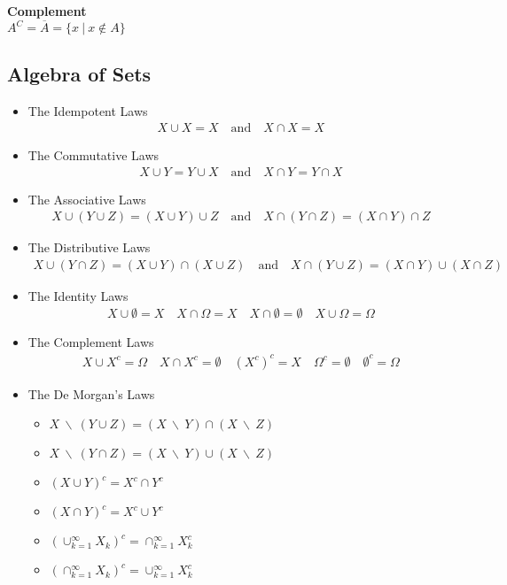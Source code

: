 \documentclass{article}
\numberwithin{theorem}{subsection}
\numberwithin{theorem}{subsubsection}
\numberwithin{lemma}{subsection}
\numberwithin{lemma}{subsubsection}
\theoremstyle{definition}
\numberwithin{definition}{subsection}
\numberwithin{definition}{subsubsection}
\begin{document}
\noindent \textbf{Complement} \\
\indent $A^{C} = \overline{A} = \{x\ |\ x \notin A\}$ \\

\subsection{Algebra of Sets}
\begin{itemize}
    \item The Idempotent Laws 
    \begin{gather*}
        X \cup X = X \quad \text{and} \quad X \cap X = X
    \end{gather*}
    \item The Commutative Laws
    \begin{gather*}
        X \cup Y = Y \cup X \quad \text{and} \quad X \cap Y = Y \cap X
    \end{gather*}
    \item The Associative Laws
    \begin{gather*}
        X \cup (Y \cup Z) = (X \cup Y) \cup Z \quad \text{and} \quad X \cap (Y \cap Z) = (X \cap Y) \cap Z
    \end{gather*}
    \item The Distributive Laws
    \begin{gather*}
        X \cup (Y \cap Z) = (X \cup Y) \cap (X \cup Z) \quad \text{and} \quad X \cap (Y \cup Z) = (X \cap Y) \cup (X \cap Z)
    \end{gather*}
    \item{The Identity Laws}
    \begin{gather*}
        X \cup \emptyset = X \quad X \cap \Omega = X \quad X \cap \emptyset = \emptyset \quad X \cup \Omega = \Omega
    \end{gather*}
    \item{The Complement Laws}
    \begin{gather*}
        X \cup X^{c} = \Omega \quad X \cap X^{c} = \emptyset \quad (X^{c})^{c} = X \quad \Omega^{c} = \emptyset \quad \emptyset^{c} = \Omega
    \end{gather*}
    \item{The De Morgan's Laws}
    \begin{itemize}
        \item $X\ \backslash \ (Y \cup Z) = (X\ \backslash \ Y) \cap (X\ \backslash\  Z)$
        \item $X\ \backslash \ (Y \cap Z) = (X\ \backslash\ Y) \cup (X\ \backslash\ Z)$
        \item $(X \cup Y)^{c} = X^{c} \cap Y^{c}$
        \item $(X \cap Y)^{c} = X^{c} \cup Y^{c}$
        \item $(\cup_{k=1}^{\infty}X_{k})^{c} = \cap_{k=1}^{\infty}X_{k}^{c}$
        \item $(\cap_{k=1}^{\infty}X_{k})^{c} = \cup_{k=1}^{\infty}X_{k}^{c}$
    \end{itemize}
    
\end{itemize}
\end{document}
